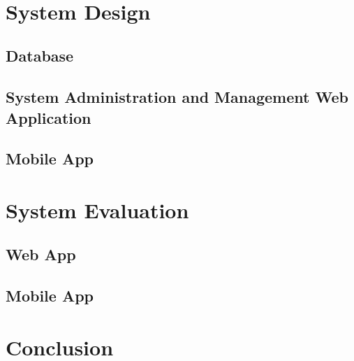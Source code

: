   ~\cite{JSON_REST_interface}


\chapter{System Design}	%
  \section{Database}
    
  \section{System Administration and Management Web Application}

  \section{Mobile App}


\chapter{System Evaluation}	%
\section{Web App}

\section{Mobile App}


\chapter{Conclusion}	%

